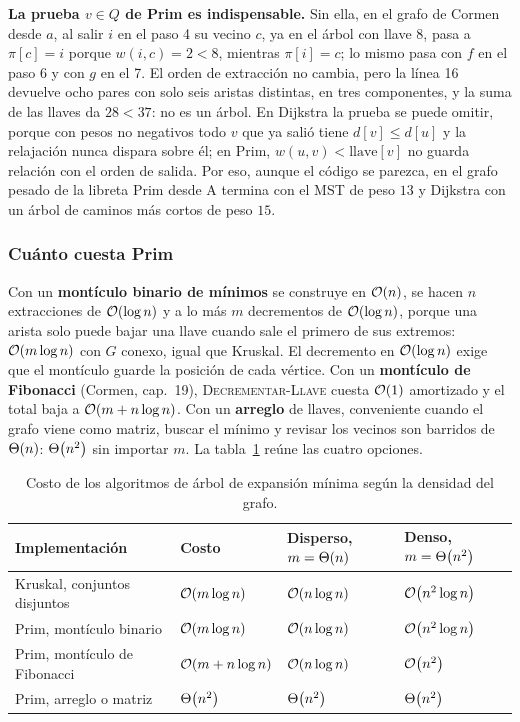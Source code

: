 \documentclass[11pt,letterpaper]{article}
\begin{document}
\begin{ojo}
  \textbf{La prueba $v \in Q$ de Prim es indispensable.} Sin ella, en
  el grafo de Cormen desde $a$, al salir $i$ en el paso 4 su vecino
  $c$, ya en el árbol con llave $8$, pasa a $\pi[c] = i$ porque
  $w(i, c) = 2 < 8$, mientras $\pi[i] = c$; lo mismo pasa con $f$ en el
  paso 6 y con $g$ en el 7. El orden de extracción no cambia, pero la
  línea 16 devuelve ocho pares con solo seis aristas distintas, en tres
  componentes, y la suma de las llaves da $28 < 37$: no es un árbol.
  En Dijkstra la prueba se puede omitir, porque con pesos no negativos
  todo $v$ que ya salió tiene $d[v] \le d[u]$ y la relajación nunca
  dispara sobre él; en Prim, $w(u, v) < \text{llave}[v]$ no guarda
  relación con el orden de salida. Por eso, aunque el código se parezca,
  en el grafo pesado de la libreta Prim desde A termina con el MST de
  peso $13$ y Dijkstra con un árbol de caminos más cortos de peso $15$.
\end{ojo}

\subsubsection*{Cuánto cuesta Prim}

Con un \textbf{montículo binario de mínimos} se construye en
$\mathcal{O}\!\left(n\right)$, se hacen $n$ extracciones de $\mathcal{O}\!\left(\log n\right)$ y a lo más $m$
decrementos de $\mathcal{O}\!\left(\log n\right)$, porque una arista solo puede bajar una
llave cuando sale el primero de sus extremos: $\mathcal{O}\!\left(m \log n\right)$ con $G$
conexo, igual que Kruskal. El decremento en $\mathcal{O}\!\left(\log n\right)$ exige que
el montículo guarde la posición de cada vértice. Con un
\textbf{montículo de Fibonacci} (Cormen, cap.\ 19),
\textsc{Decrementar-Llave} cuesta $\mathcal{O}\!\left(1\right)$ amortizado y el total baja
a $\mathcal{O}\!\left(m + n \log n\right)$. Con un \textbf{arreglo} de llaves, conveniente
cuando el grafo viene como matriz, buscar el mínimo y revisar los
vecinos son barridos de $\Theta\!\left(n\right)$: $\Theta\!\left(n^2\right)$ sin importar $m$. La
tabla~\ref{tab:costos-mst} reúne las cuatro opciones.

\begin{table}[H]
\centering
\small
\begin{tabular}{llll}
  \toprule
  \textbf{Implementación} & \textbf{Costo}
    & \textbf{Disperso, $m = \Theta\!\left(n\right)$} & \textbf{Denso, $m = \Theta\!\left(n^2\right)$} \\
  \midrule
  Kruskal, conjuntos disjuntos & $\mathcal{O}\!\left(m \log n\right)$ & $\mathcal{O}\!\left(n \log n\right)$
    & $\mathcal{O}\!\left(n^2 \log n\right)$ \\
  Prim, montículo binario & $\mathcal{O}\!\left(m \log n\right)$ & $\mathcal{O}\!\left(n \log n\right)$
    & $\mathcal{O}\!\left(n^2 \log n\right)$ \\
  Prim, montículo de Fibonacci & $\mathcal{O}\!\left(m + n \log n\right)$
    & $\mathcal{O}\!\left(n \log n\right)$ & $\mathcal{O}\!\left(n^2\right)$ \\
  Prim, arreglo o matriz & $\Theta\!\left(n^2\right)$ & $\Theta\!\left(n^2\right)$ & $\Theta\!\left(n^2\right)$ \\
  \bottomrule
\end{tabular}
\caption{Costo de los algoritmos de árbol de expansión mínima según la
         densidad del grafo.}
\label{tab:costos-mst}
\end{table}
\end{document}
